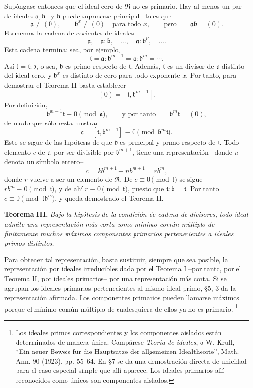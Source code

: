 \documentclass[11pt]{article}
\providecommand{\mR}{\mathfrak{R}}
\providecommand{\ma}{\mathfrak{a}}
\providecommand{\mb}{\mathfrak{b}}
\providecommand{\mc}{\mathfrak{c}}
\providecommand{\mt}{\mathfrak{t}}
\begin{document}
Supóngase entonces que el ideal cero de $\mR$ no es primario. Hay al menos un par de ideales $\ma,\mb$ --y $\mb$ puede suponerse principal-- tales que
\[
\ma\ne(0),\qquad \mb^x\ne(0)\quad\text{para todo }x,
\qquad\text{pero}\qquad \ma\mb=(0).
\]
Formemos la cadena de cocientes de ideales
\[
\ma,\quad \ma:\mb,\quad \ldots,\quad \ma:\mb^\nu,\quad\ldots .
\]
Esta cadena termina; sea, por ejemplo,
\[
\mt=\ma:\mb^{m-1}=\ma:\mb^m=\cdots .
\]
Así $\mt=\mt:\mb$, o sea, $\mb$ es primo respecto de $\mt$. Además, $\mt$ es un divisor de $\ma$ distinto del ideal cero, y $\mb^x$ es distinto de cero para todo exponente $x$. Por tanto, para demostrar el Teorema II basta establecer
\[
        (0)=[\mt,\mb^{m+1}].
\]
Por definición,
\[
        \mb^{m-1}\mt\equiv0\pmod{\ma},\qquad\text{y por tanto}\qquad \mb^m\mt=(0),
\]
de modo que sólo resta mostrar
\[
        \mc=[\mt,\mb^{m+1}]\equiv0\pmod{\mb^m\mt}.
\]
Esto se sigue de las hipótesis de que $\mb$ es principal y primo respecto de $\mt$. Todo elemento $c$ de $\mc$, por ser divisible por $\mb^{m+1}$, tiene una representación --donde $n$ denota un símbolo entero--
\[
        c=k b^{m+1}+n b^{m+1}=r b^m,
\]
donde $r$ vuelve a ser un elemento de $\mR$. De $c\equiv0\pmod{\mt}$ se sigue $r b^m\equiv0\pmod{\mt}$, y de ahí $r\equiv0\pmod{\mt}$, puesto que $\mt:\mb=\mt$. Por tanto $c\equiv0\pmod{\mt\mb^m}$, y queda demostrado el Teorema II.

\textbf{Teorema III.} \emph{Bajo la hipótesis de la condición de cadena de divisores, todo ideal admite una representación más corta como mínimo común múltiplo de finitamente muchos máximos componentes primarios pertenecientes a ideales primos distintos.}

Para obtener tal representación, basta sustituir, siempre que sea posible, la representación por ideales irreducibles dada por el Teorema I --por tanto, por el Teorema II, por ideales primarios-- por una representación más corta. Si se agrupan los ideales primarios pertenecientes al mismo ideal primo, §5, 3 da la representación afirmada. Los componentes primarios pueden llamarse máximos porque el mínimo común múltiplo de cualesquiera de ellos ya no es primario.
\footnote{Los ideales primos correspondientes y los componentes aislados están determinados de manera única. Compárese \emph{Teoría de ideales}, o W. Krull, ``Ein neuer Beweis für die Hauptsätze der allgemeinen Idealtheorie'', Math. Ann. 90 (1923), pp. 55--64. En §7 se da una demostración directa de unicidad para el caso especial simple que allí aparece. Los ideales primarios allí reconocidos como únicos son componentes aislados.}
\end{document}
